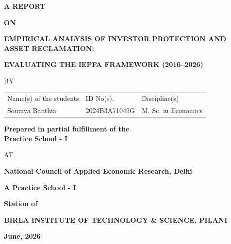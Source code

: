 \documentclass[openany]{book}
\begin{document}


\large

\thispagestyle{empty}
\centerline{\bf A REPORT}
\vspace*{0.3cm}
\centerline{\bf ON}
\vspace*{0.3cm}
\centerline{\bf EMPIRICAL ANALYSIS OF INVESTOR PROTECTION AND ASSET RECLAMATION:} %
\centerline{\bf EVALUATING THE IEPFA FRAMEWORK (2016--2026)}
\vspace*{2cm}

\centerline{BY}
\vspace*{1cm}

\begin{center}
	\begin{tabular}{lll} %
		Name(s) of the students & \hspace*{2cm} ID No(s). & \hspace*{2cm} Discipline(s) \\ 
		Soumya Banthia &\hspace*{2cm} 2024B3A71049G &\hspace*{2cm} M. Sc. in Economics \\

	\end{tabular}
\end{center}

\vspace*{2cm}
\begin{center}
	{\bf Prepared in partial fulfillment of the \\
	Practice School - I} \\ %
\end{center}

\vspace*{0.5cm}

\centerline{AT}

\vspace*{1cm}
        \centerline{\bf National Council of Applied Economic Research, Delhi} %
	\vspace{0.2cm}
	\centerline{\bf A Practice School - I}
	\vspace{0.2cm}
	\centerline{\bf Station of}
	\vspace{0.5cm}
\begin{figure}[ht]
\epsfxsize=1.0in
\centerline{}
\end{figure}

	\centerline{\bf BIRLA INSTITUTE OF TECHNOLOGY \& SCIENCE, PILANI}
	\vspace*{0.5cm}
	\centerline{\bf June, 2026} %
	\newpage
\end{document}
